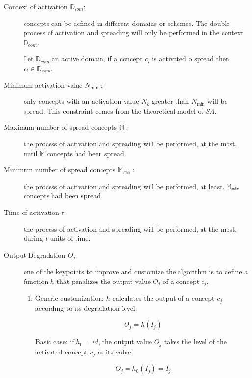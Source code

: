 \begin{description}

\item[Context of activation $\mathbb{D}_{com}$:] concepts can be defined in different
domains or schemes. The double process of activation and spreading will only be performed in the
context $\mathbb{D}_{com}$.


\begin{definition}
Let $\mathbb{D}_{com}$ an active domain, if a concept $c_i$ is activated o
spread then $c_{i} \in \mathbb{D}_{com}$.
\end{definition}

\item[Minimum activation value $N_{\min}$ :] only concepts with an activation
value $N_k$ greater than $N_{\min}$ will be spread. This constraint comes from
the theoretical model of \textit{SA}.

\item[Maximum number of spread concepts $\mathbb{M}$ :] the process of
activation and spreading will be performed, at the most, until $\mathbb{M}$ concepts
had been spread.

\item[Minimum number of spread concepts $\mathbb{M_{\min}}$ :] the process of
activation and spreading will be performed, at least, $\mathbb{M_{\min}}$ concepts had
been spread.

\item[Time of activation $t$:] the process of activation and spreading
will be performed, at the most, during $t$ units of time.

\item[Output Degradation $O_j$:] one of the keypoints to improve and customize
the algorithm is to define a function $h$ that penalizes the output value $O_j$
of a concept $c_j$.

\begin{enumerate}

\item Generic customization: $h$ calculates the output of a concept $c_j$
according to its degradation level.

\begin{equation}
O_j = h(I_j)
\end{equation}

Basic case: if $h_0 = id$, the output value $O_j$ takes the level of the
activated concept $c_j$ as its value.

\begin{equation}
O_j = h_0(I_j) = I_j
\end{equation}



\end{enumerate}
\end{description}
